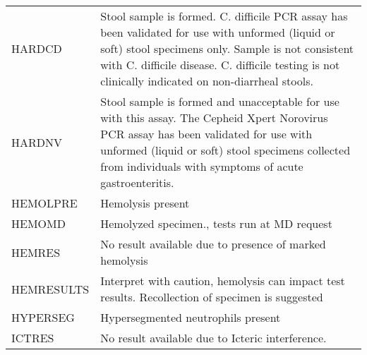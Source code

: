 \begin{fullwidth}
\begin{longtable}{p{.20\linewidth} p{.75\linewidth}}
HARDCD      & Stool sample is formed. C. difficile PCR assay has been validated for use with unformed (liquid or soft) stool specimens only. Sample is not consistent with C. difficile disease. C. difficile testing is not clinically indicated on non-diarrheal stools.                                 \\
HARDNV      & Stool sample is formed and unacceptable for use with this assay. The Cepheid Xpert Norovirus PCR assay has been validated for use with unformed (liquid or soft) stool specimens collected from individuals with symptoms of acute gastroenteritis.                                          \\
HEMOLPRE    & Hemolysis present                                                                                                                                                                                                                                                                            \\
HEMOMD      & Hemolyzed specimen., tests run at MD request                                                                                                                                                                                                                                                 \\
HEMRES      & No result available due to presence of marked hemolysis                                                                                                                                                                                                                                      \\
HEMRESULTS  & Interpret with caution, hemolysis can impact test results. Recollection of specimen is suggested                                                                                                                                                                                             \\
HYPERSEG    & Hypersegmented neutrophils present                                                                                                                                                                                                                                                           \\
ICTRES      & No result available due to Icteric interference.                                                                                                                                                                                                                                             \\

\end{longtable}
\end{fullwidth}
